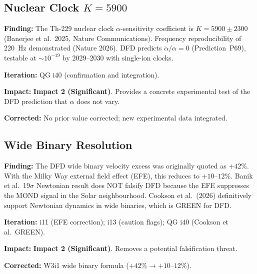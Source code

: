 \documentclass[11pt,a4paper]{article}
\newcommand{\imptwo}{\textcolor{impact2}{\textbf{Impact 2 (Significant)}}}
\begin{document}
\subsection{Nuclear Clock $K = 5900$}
\label{sec:nuclear-clock}

\begin{tcolorbox}[colback=green!5!white, colframe=green!50!black,
  title=\textbf{Th-229 Nuclear Clock $K = 5900 \pm 2300$ --- QG Cycle i40}]

\textbf{Finding:} The Th-229 nuclear clock $\alpha$-sensitivity
coefficient is $K = 5900 \pm 2300$ (Banerjee et al.\ 2025, Nature
Communications). Frequency reproducibility of 220~Hz demonstrated
(Nature 2026). DFD predicts $\dot\alpha / \alpha = 0$ (Prediction~P69),
testable at $\sim 10^{-19}$ by 2029--2030 with single-ion clocks.

\textbf{Iteration:} QG i40 (confirmation and integration).

\textbf{Impact:} \imptwo. Provides a concrete experimental test of
the DFD prediction that $\alpha$ does not vary.

\textbf{Corrected:} No prior value corrected; new experimental data
integrated.

\end{tcolorbox}

\subsection{Wide Binary Resolution}
\label{sec:wide-binaries}

\begin{tcolorbox}[colback=green!5!white, colframe=green!50!black,
  title=\textbf{Wide Binaries: $+42\% \to +10$--$12\%$ with EFE --- Iteration 11}]

\textbf{Finding:} The DFD wide binary velocity excess was originally
quoted as $+42\%$. With the Milky Way external field effect (EFE), this
reduces to $+10$--$12\%$. Banik et al.\ 19$\sigma$ Newtonian result
does NOT falsify DFD because the EFE suppresses the MOND signal in the
Solar neighbourhood. Cookson et al.\ (2026) definitively support
Newtonian dynamics in wide binaries, which is GREEN for DFD.

\textbf{Iteration:} i11 (EFE correction); i13 (caution flags); QG i40
(Cookson et al.\ GREEN).

\textbf{Impact:} \imptwo. Removes a potential falsification threat.

\textbf{Corrected:} W3i1 wide binary formula ($+42\% \to +10$--$12\%$).

\end{tcolorbox}
\end{document}
